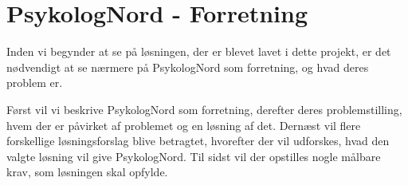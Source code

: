 \section{PsykologNord - Forretning}
\label{kabitel:Forretning}

Inden vi begynder at se på løsningen, der er blevet lavet i dette projekt, er det nødvendigt at se nærmere på PsykologNord som forretning, og hvad deres problem er.

Først vil vi beskrive PsykologNord som forretning, derefter deres problemstilling, hvem der er påvirket af problemet og en løsning af det.
Dernæst vil flere forskellige løsningsforslag blive betragtet, hvorefter der vil udforskes, hvad den valgte løsning vil give PsykologNord.
Til sidst vil der opstilles nogle målbare krav, som løsningen skal opfylde.









